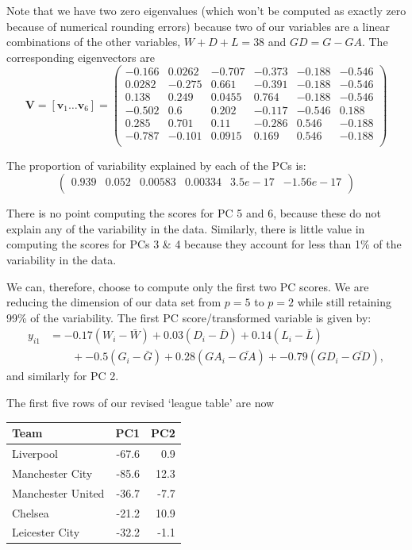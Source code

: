 \documentclass[
]{book}
\theoremstyle{definition}
\theoremstyle{definition}
\theoremstyle{definition}
\theoremstyle{definition}
\theoremstyle{remark}
\begin{document}
Note that we have two zero eigenvalues (which won't be computed as exactly zero because of numerical rounding errors) because two of our variables are a linear combinations of the other variables, \(W+D+L = 38\) and \(GD=G-GA\). The corresponding eigenvectors are
\[\mathbf V= [\mathbf v_1 \ldots \mathbf v_6] =\begin{pmatrix}-0.166&0.0262&-0.707&-0.373&-0.188&-0.546 \\0.0282&-0.275&0.661&-0.391&-0.188&-0.546 \\0.138&0.249&0.0455&0.764&-0.188&-0.546 \\-0.502&0.6&0.202&-0.117&-0.546&0.188 \\0.285&0.701&0.11&-0.286&0.546&-0.188 \\-0.787&-0.101&0.0915&0.169&0.546&-0.188 \\\end{pmatrix}\]

The proportion of variability explained by each of the PCs is:
\[
\begin{pmatrix}0.939&0.052&0.00583&0.00334&3.5e-17&-1.56e-17 \\\end{pmatrix}
\]

There is no point computing the scores for PC 5 and 6, because these do not explain any of the variability in the data. Similarly, there is little value in computing the scores for PCs 3 \& 4 because they account for less than 1\% of the variability in the data.

We can, therefore, choose to compute only the first two PC scores. We are reducing the dimension of our data set from \(p=5\) to \(p=2\) while still retaining 99\% of the variability. The first PC score/transformed variable is given by:
\begin{align*}
y_{i1} &= -0.17(W_i-\bar{W}) +0.03(D_i-\bar{D}) +0.14(L_i-\bar{L})\\
& \qquad +-0.5(G_i-\bar{G}) +0.28(GA_i-\bar{GA})+-0.79(GD_i-\bar{GD}),
\end{align*}
and similarly for PC 2.

The first five rows of our revised `league table' are now

\begin{table}
\centering
\begin{tabular}{lrr}
\toprule
Team & PC1 & PC2\\
\midrule
Liverpool & -67.6 & 0.9\\
Manchester City & -85.6 & 12.3\\
Manchester United & -36.7 & -7.7\\
Chelsea & -21.2 & 10.9\\
Leicester City & -32.2 & -1.1\\
\bottomrule
\end{tabular}
\end{table}
\end{document}

